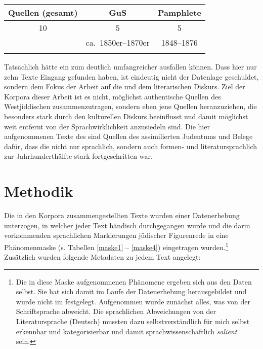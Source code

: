   	\begin{table} 
 		\begin{tabular}{ccc}
\lsptoprule
	\textbf{Quellen (gesamt)  }&\textbf{GuS} 	&  \textbf{Pamphlete}	\\ 
\midrule 
			  10 	&	5	&	5	 \\
			  	&	ca.\, 1850er–1870er & 1848--1876\\ 
\lspbottomrule
		 \end{tabular}
		 \caption{ }
		 \label{tbljüliji}
		 \end{table}
	 	
 Tatsächlich hätte ein  zum  deutlich umfangreicher ausfallen können. Dass hier nur zehn Texte Eingang gefunden haben, ist eindeutig nicht der Datenlage geschuldet, %
 sondern dem Fokus der Arbeit auf die  und dem literarischen Diskurs. Ziel der Korpora dieser Arbeit ist es nicht, möglichst authentische Quellen des Westjiddischen zusammenzutragen, sondern eben jene Quellen heranzuziehen, die besonders stark durch den kulturellen Diskurs beeinflusst  und damit möglichst weit entfernt von der Sprachwirklichkeit anzusiedeln sind. Die hier aufgenommenen Texte des  sind Quellen des assimilierten Judentums und Belege dafür, dass die  nicht nur sprachlich, sondern auch formen- und literatursprachlich zur Jahrhunderthälfte stark fortgeschritten war.

  

                   
 \section{Methodik}\label{erhebungsmethode}


Die in den Korpora zusammengestellten Texte wurden einer Datenerhebung unterzogen, in welcher jeder Text händisch durchgegangen wurde und die darin vorkommenden sprachlichen Markierungen jüdischer Figurenrede in eine Phänomenmaske (s. Tabellen \ref{maske1} -- \ref{maske4}) eingetragen wurden.\footnote{Die in diese Maske aufgenommenen Phänomene ergeben sich aus den Daten selbst. Sie hat sich damit im Laufe der Datenerhebung herausgebildet und wurde nicht im  festgelegt. Aufgenommen wurde zunächst alles, was von der Schriftsprache abweicht. Die sprachlichen Abweichungen von der Literatursprache (Deutsch) mussten dazu selbstverständlich für mich selbst erkennbar und kategorisierbar und damit sprachwissenschaftlich \textit{salient} sein.} Zusätzlich wurden folgende Metadaten zu jedem Text angelegt:
 
